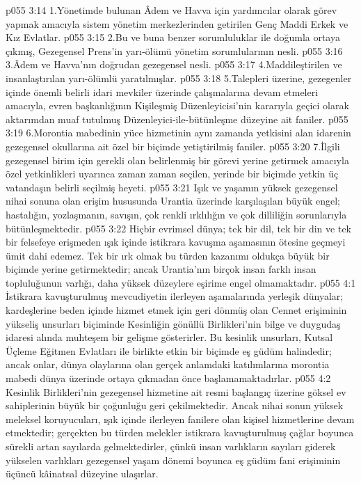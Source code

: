 \vs p055 3:14 1.\bibnobreakspace Yönetimde bulunan Âdem ve Havva için yardımcılar olarak görev yapmak amacıyla sistem yönetim merkezlerinden getirilen Genç Maddi Erkek ve Kız Evlatlar.
\vs p055 3:15 2.\bibnobreakspace Bu ve buna benzer sorumluluklar ile doğumla ortaya çıkmış, Gezegensel Prens’in yarı\hyp{}ölümü yönetim sorumlularının nesli.
\vs p055 3:16 3.\bibnobreakspace Âdem ve Havva’nın doğrudan gezegensel nesli.
\vs p055 3:17 4.\bibnobreakspace Maddileştirilen ve insanlaştırılan yarı\hyp{}ölümlü yaratılmışlar.
\vs p055 3:18 5.\bibnobreakspace Talepleri üzerine, gezegenler içinde önemli belirli idari mevkiler üzerinde çalışmalarına devam etmeleri amacıyla, evren başkanlığının Kişileşmiş Düzenleyicisi’nin kararıyla geçici olarak aktarımdan muaf tutulmuş Düzenleyici\hyp{}ile\hyp{}bütünleşme düzeyine ait faniler.
\vs p055 3:19 6.\bibnobreakspace Morontia mabedinin yüce hizmetinin aynı zamanda yetkisini alan idarenin gezegensel okullarına ait özel bir biçimde yetiştirilmiş faniler.
\vs p055 3:20 7.\bibnobreakspace İlgili gezegensel birim için gerekli olan belirlenmiş bir görevi yerine getirmek amacıyla özel yetkinlikleri uyarınca zaman zaman seçilen, yerinde bir biçimde yetkin üç vatandaşın belirli seçilmiş heyeti.
\vs p055 3:21 Işık ve yaşamın yüksek gezegensel nihai sonuna olan erişim hususunda Urantia üzerinde karşılaşılan büyük engel; hastalığın, yozlaşmanın, savışın, çok renkli ırklılığın ve çok dilliliğin sorunlarıyla bütünleşmektedir.
\vs p055 3:22 Hiçbir evrimsel dünya; tek bir dil, tek bir din ve tek bir felsefeye erişmeden ışık içinde istikrara kavuşma aşamasının ötesine geçmeyi ümit dahi edemez. Tek bir ırk olmak bu türden kazanımı oldukça büyük bir biçimde yerine getirmektedir; ancak Urantia’nın birçok insan farklı insan topluluğunun varlığı, daha yüksek düzeylere eşirime engel olmamaktadır.
\vs p055 4:1 İstikrara kavuşturulmuş mevcudiyetin ilerleyen aşamalarında yerleşik dünyalar; kardeşlerine beden içinde hizmet etmek için geri dönmüş olan Cennet erişiminin yükseliş unsurları biçiminde Kesinliğin gönüllü Birlikleri’nin bilge ve duygudaş idaresi alında muhteşem bir gelişme gösterirler. Bu kesinlik unsurları, Kutsal Üçleme Eğitmen Evlatları ile birlikte etkin bir biçimde eş güdüm halindedir; ancak onlar, dünya olaylarına olan gerçek anlamdaki katılımlarına morontia mabedi dünya üzerinde ortaya çıkmadan önce başlamamaktadırlar.
\vs p055 4:2 Kesinlik Birlikleri’nin gezegensel hizmetine ait resmi başlangıç üzerine göksel ev sahiplerinin büyük bir çoğunluğu geri çekilmektedir. Ancak nihai sonun yüksek meleksel koruyucuları, ışık içinde ilerleyen fanilere olan kişisel hizmetlerine devam etmektedir; gerçekten bu türden melekler istikrara kavuşturulmuş çağlar boyunca sürekli artan sayılarda gelmektedirler, çünkü insan varlıkların sayıları giderek yükselen varlıkları gezegensel yaşam dönemi boyunca eş güdüm fani erişiminin üçüncü kâinatsal düzeyine ulaşırlar.
